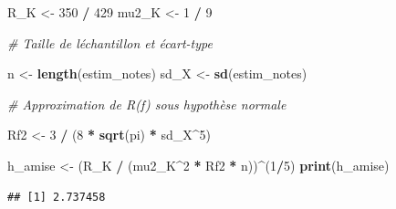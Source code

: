 \documentclass[
  12pt,
]{article}
\newenvironment{Shaded}{\begin{snugshade}}{\end{snugshade}}
\newcommand{\CommentTok}[1]{\textcolor[rgb]{0.56,0.35,0.01}{\textit{#1}}}
\newcommand{\DecValTok}[1]{\textcolor[rgb]{0.00,0.00,0.81}{#1}}
\newcommand{\FunctionTok}[1]{\textcolor[rgb]{0.13,0.29,0.53}{\textbf{#1}}}
\newcommand{\NormalTok}[1]{#1}
\newcommand{\OtherTok}[1]{\textcolor[rgb]{0.56,0.35,0.01}{#1}}
\newcommand{\SpecialCharTok}[1]{\textcolor[rgb]{0.81,0.36,0.00}{\textbf{#1}}}
\begin{document}
\begin{Shaded}
\begin{Highlighting}[]
\NormalTok{R\_K }\OtherTok{\textless{}{-}} \DecValTok{350} \SpecialCharTok{/} \DecValTok{429}
\NormalTok{mu2\_K }\OtherTok{\textless{}{-}} \DecValTok{1} \SpecialCharTok{/} \DecValTok{9}

\CommentTok{\# Taille de l\textquotesingle{}échantillon et écart{-}type}

\NormalTok{n }\OtherTok{\textless{}{-}} \FunctionTok{length}\NormalTok{(estim\_notes)}
\NormalTok{sd\_X }\OtherTok{\textless{}{-}} \FunctionTok{sd}\NormalTok{(estim\_notes)}

\CommentTok{\# Approximation de R(f\textquotesingle{}\textquotesingle{}) sous hypothèse normale}

\NormalTok{Rf2 }\OtherTok{\textless{}{-}} \DecValTok{3} \SpecialCharTok{/}\NormalTok{ (}\DecValTok{8} \SpecialCharTok{*} \FunctionTok{sqrt}\NormalTok{(pi) }\SpecialCharTok{*}\NormalTok{ sd\_X}\SpecialCharTok{\^{}}\DecValTok{5}\NormalTok{)}


\NormalTok{h\_amise }\OtherTok{\textless{}{-}}\NormalTok{ (R\_K }\SpecialCharTok{/}\NormalTok{ (mu2\_K}\SpecialCharTok{\^{}}\DecValTok{2} \SpecialCharTok{*}\NormalTok{ Rf2 }\SpecialCharTok{*}\NormalTok{ n))}\SpecialCharTok{\^{}}\NormalTok{(}\DecValTok{1}\SpecialCharTok{/}\DecValTok{5}\NormalTok{)}
\FunctionTok{print}\NormalTok{(h\_amise)}
\end{Highlighting}
\end{Shaded}

\begin{verbatim}
## [1] 2.737458
\end{verbatim}
\end{document}
